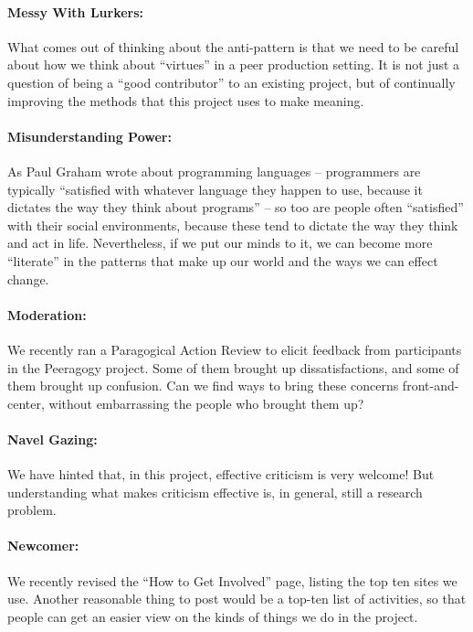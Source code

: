\paragraph{Messy With Lurkers:} What comes out of thinking about the anti-pattern is that we need to be
careful about how we think about “virtues” in a peer production setting.
It is not just a question of being a “good contributor” to an existing
project, but of continually improving the methods that this project uses
to make meaning.

\paragraph{Misunderstanding Power:} As Paul Graham wrote about programming languages – programmers are
typically “satisfied with whatever language they happen to use, because
it dictates the way they think about programs” – so too are people often
“satisfied” with their social environments, because these tend to
dictate the way they think and act in life. Nevertheless, if we put our
minds to it, we can become more “literate” in the patterns that make up
our world and the ways we can effect change.

\paragraph{Moderation:} We recently ran a Paragogical Action Review to elicit feedback from
participants in the Peeragogy project. Some of them brought up
dissatisfactions, and some of them brought up confusion. Can we find
ways to bring these concerns front-and-center, without embarrassing the
people who brought them up?

\paragraph{Navel Gazing:} We have hinted that, in this project, effective criticism is very
welcome! But understanding what makes criticism effective is, in
general, still a research problem.

\paragraph{Newcomer:} We recently revised the “How to Get Involved” page, listing the top ten
sites we use. Another reasonable thing to post would be a top-ten list
of activities, so that people can get an easier view on the kinds of
things we do in the project.

